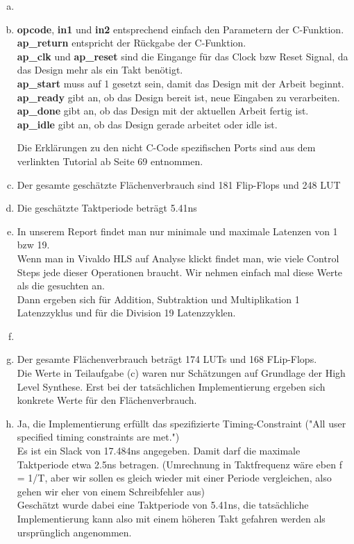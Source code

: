\documentclass[a4paper]{scrartcl}
\begin{document}
\begin{enumerate}[(a)]
	\item
	\item \textbf{opcode}, \textbf{in1} und \textbf{in2} entsprechend einfach den Parametern der C-Funktion.\\
	\textbf{ap\_return} entspricht der Rückgabe der C-Funktion.\\
	\textbf{ap\_clk} und \textbf{ap\_reset} sind die Eingange für das Clock bzw Reset Signal, da das Design mehr als ein Takt benötigt.\\
	\textbf{ap\_start} muss auf 1 gesetzt sein, damit das Design mit der Arbeit beginnt.\\
	\textbf{ap\_ready} gibt an, ob das Design bereit ist, neue Eingaben zu verarbeiten.\\
	\textbf{ap\_done} gibt an, ob das Design mit der aktuellen Arbeit fertig ist.\\
	\textbf{ap\_idle} gibt an, ob das Design gerade arbeitet oder idle ist.
	
	Die Erklärungen zu den nicht C-Code spezifischen Ports sind aus dem verlinkten Tutorial ab Seite 69 entnommen.
	\item Der gesamte geschätzte Flächenverbrauch sind 181 Flip-Flops und 248 LUT
	\item Die geschätzte Taktperiode beträgt 5.41ns
	\item In unserem Report findet man nur minimale und maximale Latenzen von 1 bzw 19.\\
	Wenn man in Vivaldo HLS auf Analyse klickt findet man, wie viele Control Steps jede dieser Operationen braucht. Wir nehmen einfach mal diese Werte als die gesuchten an.\\
	Dann ergeben sich für Addition, Subtraktion und Multiplikation 1 Latenzzyklus und für die Division 19 Latenzzyklen.
	
	\item	
	
	\item Der gesamte Flächenverbrauch beträgt 174 LUTs und 168 FLip-Flops.\\
	Die Werte in Teilaufgabe (c) waren nur Schätzungen auf Grundlage der High Level Synthese. Erst bei der tatsächlichen Implementierung ergeben sich konkrete Werte für den Flächenverbrauch. 
	\item Ja, die Implementierung erfüllt das spezifizierte Timing-Constraint ("All user specified timing constraints are met.")\\
	
	Es ist ein Slack von 17.484ns angegeben. Damit darf die maximale Taktperiode etwa 2.5ns betragen. (Umrechnung in Taktfrequenz wäre eben f = 1/T, aber wir sollen es gleich wieder mit einer Periode vergleichen, also gehen wir eher von einem Schreibfehler aus)\\
	Geschätzt wurde dabei eine Taktperiode von 5.41ns, die tatsächliche Implementierung kann also mit einem höheren Takt gefahren werden als ursprünglich angenommen.
\end{enumerate}

	
\end{document}
